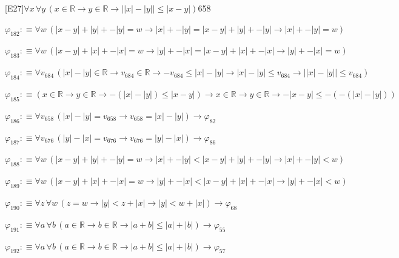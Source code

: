 \begin{fullproof}{[E27]}{$\forall x\,\forall y\,(x \in \mathbb{R} \to y \in \mathbb{R} \to \lvert \lvert x \rvert - \lvert y \rvert \rvert \leq \lvert x - y \rvert)$}{658}
\begin{abbrevlist}
\item $\varphi_{182} :\equiv \forall w\,(\lvert x - y \rvert + \lvert y \rvert + -\lvert y \rvert = w \to \lvert x \rvert + -\lvert y \rvert = \lvert x - y \rvert + \lvert y \rvert + -\lvert y \rvert \to \lvert x \rvert + -\lvert y \rvert = w)$
\item $\varphi_{183} :\equiv \forall w\,(\lvert x - y \rvert + \lvert x \rvert + -\lvert x \rvert = w \to \lvert y \rvert + -\lvert x \rvert = \lvert x - y \rvert + \lvert x \rvert + -\lvert x \rvert \to \lvert y \rvert + -\lvert x \rvert = w)$
\item $\varphi_{184} :\equiv \forall v_{684}\,(\lvert x \rvert - \lvert y \rvert \in \mathbb{R} \to v_{684} \in \mathbb{R} \to -v_{684} \leq \lvert x \rvert - \lvert y \rvert \to \lvert x \rvert - \lvert y \rvert \leq v_{684} \to \lvert \lvert x \rvert - \lvert y \rvert \rvert \leq v_{684})$
\item $\varphi_{185} :\equiv (x \in \mathbb{R} \to y \in \mathbb{R} \to -(\lvert x \rvert - \lvert y \rvert) \leq \lvert x - y \rvert) \to x \in \mathbb{R} \to y \in \mathbb{R} \to -\lvert x - y \rvert \leq -(-(\lvert x \rvert - \lvert y \rvert))$
\item $\varphi_{186} :\equiv \forall v_{658}\,(\lvert x \rvert - \lvert y \rvert = v_{658} \to v_{658} = \lvert x \rvert - \lvert y \rvert) \to \varphi_{82}$
\item $\varphi_{187} :\equiv \forall v_{676}\,(\lvert y \rvert - \lvert x \rvert = v_{676} \to v_{676} = \lvert y \rvert - \lvert x \rvert) \to \varphi_{86}$
\item $\varphi_{188} :\equiv \forall w\,(\lvert x - y \rvert + \lvert y \rvert + -\lvert y \rvert = w \to \lvert x \rvert + -\lvert y \rvert < \lvert x - y \rvert + \lvert y \rvert + -\lvert y \rvert \to \lvert x \rvert + -\lvert y \rvert < w)$
\item $\varphi_{189} :\equiv \forall w\,(\lvert x - y \rvert + \lvert x \rvert + -\lvert x \rvert = w \to \lvert y \rvert + -\lvert x \rvert < \lvert x - y \rvert + \lvert x \rvert + -\lvert x \rvert \to \lvert y \rvert + -\lvert x \rvert < w)$
\item $\varphi_{190} :\equiv \forall z\,\forall w\,(z = w \to \lvert y \rvert < z + \lvert x \rvert \to \lvert y \rvert < w + \lvert x \rvert) \to \varphi_{68}$
\item $\varphi_{191} :\equiv \forall a\,\forall b\,(a \in \mathbb{R} \to b \in \mathbb{R} \to \lvert a + b \rvert \leq \lvert a \rvert + \lvert b \rvert) \to \varphi_{55}$
\item $\varphi_{192} :\equiv \forall a\,\forall b\,(a \in \mathbb{R} \to b \in \mathbb{R} \to \lvert a + b \rvert \leq \lvert a \rvert + \lvert b \rvert) \to \varphi_{57}$

\end{abbrevlist}
\end{fullproof}
